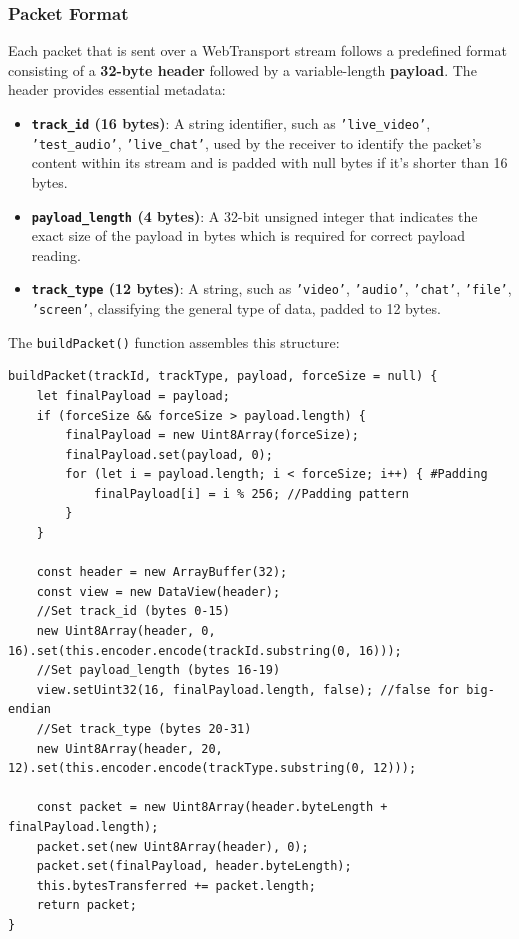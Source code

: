 \subsubsection{Packet Format}
Each packet that is sent over a WebTransport stream follows a predefined format consisting of a \textbf{32-byte header} followed by a variable-length \textbf{payload}. The header provides essential metadata:

\begin{itemize}
    \item \textbf{\texttt{track\_id} (16 bytes)}: A string identifier, such as \texttt{'live\_video'}, \texttt{'test\_audio'}, \texttt{'live\_chat'}, used by the receiver to identify the packet's content within its stream and is padded with null bytes if it's shorter than 16 bytes.
    \item \textbf{\texttt{payload\_length} (4 bytes)}: A 32-bit unsigned integer that indicates the exact size of the payload in bytes which is required for correct payload reading.
    \item \textbf{\texttt{track\_type} (12 bytes)}: A string, such as \texttt{'video'}, \texttt{'audio'}, \texttt{'chat'}, \texttt{'file'}, \texttt{'screen'}, classifying the general type of data, padded to 12 bytes.
\end{itemize}

The \texttt{buildPacket()} function assembles this structure:

\begin{lstlisting}[breaklines=true,basicstyle=\small\ttfamily,frame=single]
buildPacket(trackId, trackType, payload, forceSize = null) {
    let finalPayload = payload;
    if (forceSize && forceSize > payload.length) {
        finalPayload = new Uint8Array(forceSize);
        finalPayload.set(payload, 0);
        for (let i = payload.length; i < forceSize; i++) { #Padding
            finalPayload[i] = i % 256; //Padding pattern
        }
    }

    const header = new ArrayBuffer(32);
    const view = new DataView(header);
    //Set track_id (bytes 0-15)
    new Uint8Array(header, 0, 16).set(this.encoder.encode(trackId.substring(0, 16)));
    //Set payload_length (bytes 16-19)
    view.setUint32(16, finalPayload.length, false); //false for big-endian
    //Set track_type (bytes 20-31)
    new Uint8Array(header, 20, 12).set(this.encoder.encode(trackType.substring(0, 12)));

    const packet = new Uint8Array(header.byteLength + finalPayload.length);
    packet.set(new Uint8Array(header), 0);
    packet.set(finalPayload, header.byteLength);
    this.bytesTransferred += packet.length;
    return packet;
}
\end{lstlisting}


